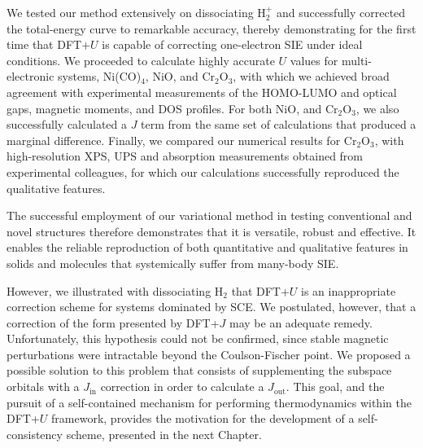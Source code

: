 {
We tested our method extensively on dissociating H$_2^+$ 
and successfully corrected the total-energy curve to remarkable accuracy, 
thereby demonstrating for the first time that DFT+$U$ is capable of correcting one-electron SIE under ideal conditions.
%
We proceeded to calculate highly accurate $U$ values 
for multi-electronic systems, Ni(CO)$_4$, NiO, and Cr$_2$O$_3$, 
with which we achieved broad agreement 
with experimental measurements of the 
HOMO-LUMO and optical gaps, 
magnetic moments, 
and DOS profiles. 
%
For both NiO, and Cr$_2$O$_3$, 
we also successfully calculated a $J$ term 
from the same set of calculations 
that produced a marginal difference.
%  
Finally, we compared our numerical results for  Cr$_2$O$_3$,
with high-resolution XPS, UPS and absorption measurements 
obtained from experimental colleagues, 
for which our calculations successfully 
reproduced the qualitative features.}

{
The successful employment of our variational method  
in testing conventional and novel structures 
therefore demonstrates that it 
is versatile, robust and effective.
%
It enables the reliable reproduction 
of both quantitative and qualitative 
features in solids and molecules 
that systemically suffer from many-body SIE.}

{
However,  
we illustrated with dissociating H$_2$ that DFT+$U$ is an inappropriate 
correction scheme for systems dominated by SCE.
%
We postulated, however, that a correction of the form presented 
by  DFT+$J$ may be an adequate remedy.
%
Unfortunately, this hypothesis could not be confirmed, 
since stable magnetic perturbations were intractable 
beyond the Coulson-Fischer point.
%
We proposed a possible solution to this problem   
that consists of supplementing the subspace orbitals 
with a $J_\textrm{in}$ correction 
in order to calculate a $J_\textrm{out}$.
%
This goal, and the pursuit of 
a self-contained mechanism for performing 
thermodynamics within the DFT+$U$ framework, 
provides the motivation for the 
development of a self-consistency scheme, 
presented in the next Chapter.}








